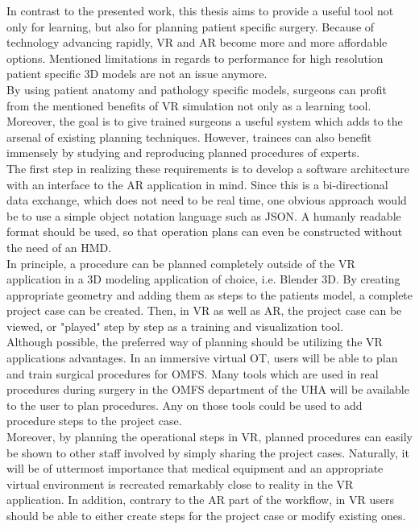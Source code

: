 In contrast to the presented work, this thesis aims to provide a useful tool not only for learning, but also for planning patient specific surgery.
Because of technology advancing rapidly, VR and AR become more and more affordable options.
Mentioned limitations in regards to performance for high resolution patient specific 3D models are not an issue anymore.
\\ By using patient anatomy and pathology specific models, surgeons can profit from the mentioned benefits of VR simulation not only as a learning tool.
Moreover, the goal is to give trained surgeons a useful system which adds to the arsenal of existing planning techniques.
However, trainees can also benefit immensely by studying and reproducing planned procedures of experts.
\\ The first step in realizing these requirements is to develop a software architecture with an interface to the AR application in mind.
Since this is a bi-directional data exchange, which does not need to be real time, one obvious approach would be to use a simple object notation language such as JSON.
A humanly readable format should be used, so that operation plans can even be constructed without the need of an HMD.
\\ In principle, a procedure can be planned completely outside of the VR application in a 3D modeling application of choice, i.e. Blender 3D.
By creating appropriate geometry and adding them as steps to the patients model, a complete project case can be created.
Then, in VR as well as AR, the project case can be viewed, or "played" step by step as a training and visualization tool.
\\ Although possible, the preferred way of planning should be utilizing the VR applications advantages.
In an immersive virtual OT, users will be able to plan and train surgical procedures for OMFS.
Many tools which are used in real procedures during surgery in the OMFS department of the UHA will be available to the user to plan procedures.
Any on those tools could be used to add procedure steps to the project case.
\\ Moreover, by planning the operational steps in VR, planned procedures can easily be shown to other staff involved by simply sharing the project cases.
Naturally, it will be of uttermost importance that medical equipment and an appropriate virtual environment is recreated remarkably close to reality in the VR application.
In addition, contrary to the AR part of the workflow, in VR users should be able to either create steps for the project case or modify existing ones.